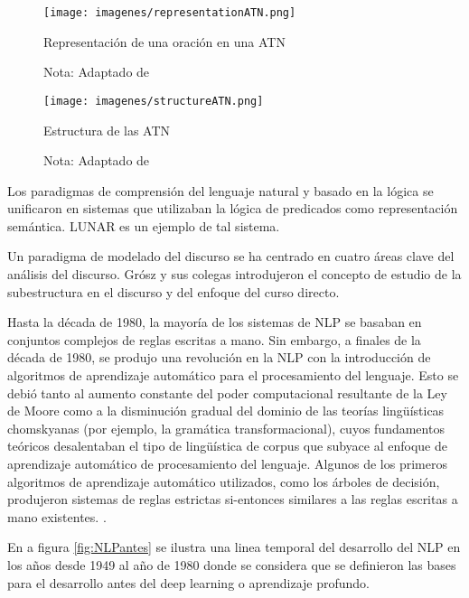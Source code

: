 \documentclass[12pt]{article}
\begin{document}
	
			
			\begin{figure}[h]
				\texttt{[image: imagenes/representationATN.png]}
				\centering
				\caption{Representación de una oración en una ATN}
				\caption*{\small Nota: Adaptado de  \cite{BrainKart.com2018}}
				\label{fig:representationATN}
			\end{figure}

			
			\begin{figure}[h]
				\texttt{[image: imagenes/structureATN.png]}
				\centering
				\caption{Estructura de las ATN}
				\caption*{\small Nota: Adaptado de  \cite{BrainKart.com2018}}
				\label{fig:structureATN}
			\end{figure}
			
			
			Los paradigmas de comprensión del lenguaje natural y basado en la lógica se unificaron en sistemas que utilizaban la lógica de predicados como representación semántica. LUNAR es un ejemplo de tal sistema.\cite{Kumar2011}	
			
			
			Un paradigma de modelado del discurso se ha centrado en cuatro áreas clave del análisis del discurso. Grósz y sus colegas introdujeron el concepto de estudio de la subestructura en el discurso y del enfoque del curso directo.\cite{Kumar2011}
			
			Hasta la década de 1980, la mayoría de los sistemas de NLP se basaban en conjuntos complejos de reglas escritas a mano. Sin embargo, a finales de la década de 1980, se produjo una revolución en la NLP con la introducción de algoritmos de aprendizaje automático para el procesamiento del lenguaje. Esto se debió tanto al aumento constante del poder computacional resultante de la Ley de Moore como a la disminución gradual del dominio de las teorías lingüísticas chomskyanas (por ejemplo, la gramática transformacional), cuyos fundamentos teóricos desalentaban el tipo de lingüística de corpus que subyace al enfoque de aprendizaje automático de procesamiento del lenguaje. Algunos de los primeros algoritmos de aprendizaje automático utilizados, como los árboles de decisión, produjeron sistemas de reglas estrictas si-entonces similares a las reglas escritas a mano existentes. \cite{umessantilal2020}.
			
			En a figura \ref{fig:NLPantes} se ilustra una linea temporal del desarrollo del NLP en los años desde 1949 al año de  1980 donde se considera que se definieron las bases para el desarrollo antes del deep learning o aprendizaje profundo.
								
\end{document}
